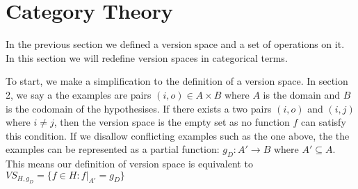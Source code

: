 \documentclass{article}
\theoremstyle{definition}
\begin{document}
\section{Category Theory}
In the previous section we defined a version space and a set of operations on it. In this section we will redefine version spaces in categorical terms.  

To start, we make a simplification to the definition of a version space. In section 2, we say a the examples are pairs $(i, o) \in A\times B$ where $A$ is the domain and $B$ is the codomain of the hypothesises. If there exists a two pairs $(i, o)$ and $(i, j)$ where $i\neq j$, then the version space is the empty set as no function $f$ can satisfy this condition. If we disallow conflicting examples such as the one above, the the examples can be represented as a partial function: $g_D : A' \rightarrow B$ where $A' \subseteq A$. This means our definition of version space is equivalent to $VS_{H,g_D} = \{f \in H : f|_{A'} = g_D\}$
\end{document}
